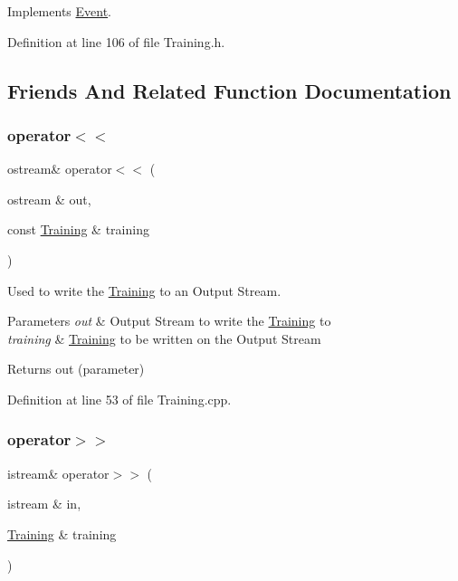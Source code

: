 Implements \hyperlink{class_event_a0c263fb7398dc2f0969a2bb22b47a40a}{Event}.



Definition at line 106 of file Training.\+h.



\subsection{Friends And Related Function Documentation}
\hypertarget{class_training_a2a462cd115913a43a1f4d7cbc8635c77}{}\label{class_training_a2a462cd115913a43a1f4d7cbc8635c77} 
\subsubsection{\texorpdfstring{operator$<$$<$}{operator<<}}
{\footnotesize\ttfamily ostream\& operator$<$$<$ (\begin{DoxyParamCaption}\item[{ostream \&}]{out,  }\item[{const \hyperlink{class_training}{Training} \&}]{training }\end{DoxyParamCaption})\hspace{0.3cm}{\ttfamily [friend]}}



Used to write the \hyperlink{class_training}{Training} to an Output Stream. 


\begin{DoxyParams}{Parameters}
{\em out} & Output Stream to write the \hyperlink{class_training}{Training} to \\
\hline
{\em training} & \hyperlink{class_training}{Training} to be written on the Output Stream \\
\hline
\end{DoxyParams}
\begin{DoxyReturn}{Returns}
out (parameter) 
\end{DoxyReturn}


Definition at line 53 of file Training.\+cpp.

\hypertarget{class_training_ad76466bb3f1163c39b684ae14adf0ca1}{}\label{class_training_ad76466bb3f1163c39b684ae14adf0ca1} 
\subsubsection{\texorpdfstring{operator$>$$>$}{operator>>}}
{\footnotesize\ttfamily istream\& operator$>$$>$ (\begin{DoxyParamCaption}\item[{istream \&}]{in,  }\item[{\hyperlink{class_training}{Training} \&}]{training }\end{DoxyParamCaption})\hspace{0.3cm}{\ttfamily [friend]}}



